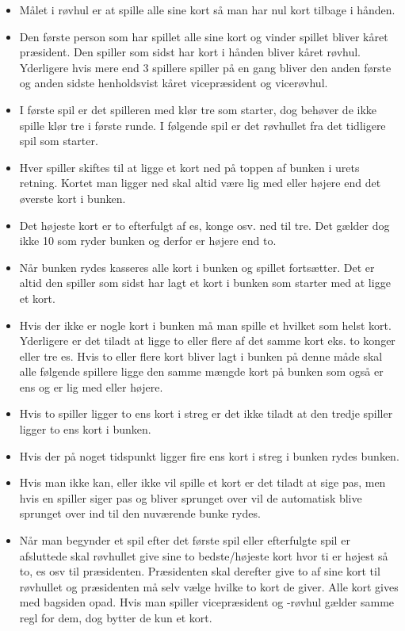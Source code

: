 \documentclass[a4paper, 12pt]{article}
\begin{document}
\begin{multicols}{2}
\begin{itemize}
	\item Målet i røvhul er at spille alle sine kort så man har nul kort tilbage i hånden.
	\item Den første person som har spillet alle sine kort og vinder spillet bliver kåret præsident. Den spiller som sidst har kort i hånden bliver kåret røvhul. Yderligere hvis mere end 3 spillere spiller på en gang bliver den anden første og anden sidste henholdsvist kåret vicepræsident og vicerøvhul.
	\item I første spil er det spilleren med klør tre som starter, dog behøver de ikke spille klør tre i første runde. I følgende spil er det røvhullet fra det tidligere spil som starter.
	\item Hver spiller skiftes til at ligge et kort ned på toppen af bunken i urets retning. Kortet man ligger ned skal altid være lig med eller højere end det øverste kort i bunken. 
	\item Det højeste kort er to efterfulgt af es, konge osv. ned til tre. Det gælder dog ikke 10 som ryder bunken og derfor er højere end to.
	\item Når bunken rydes kasseres alle kort i bunken og spillet fortsætter. Det er altid den spiller som sidst har lagt et kort i bunken som starter med at ligge et kort.
	\item Hvis der ikke er nogle kort i bunken må man spille et hvilket som helst kort. Yderligere er det tiladt at ligge to eller flere af det samme kort eks. to konger eller tre es. Hvis to eller flere kort bliver lagt i bunken på denne måde skal alle følgende spillere ligge den samme mængde kort på bunken som også er ens og er lig med eller højere.
	\item Hvis to spiller ligger to ens kort i streg er det ikke tiladt at den tredje spiller ligger to ens kort i bunken.
	\item Hvis der på noget tidspunkt ligger fire ens kort i streg i bunken rydes bunken.
	\item Hvis man ikke kan, eller ikke vil spille et kort er det tiladt at sige pas, men hvis en spiller siger pas og bliver sprunget over vil de automatisk blive sprunget over ind til den nuværende bunke rydes.
	\item Når man begynder et spil efter det første spil eller efterfulgte spil er afsluttede skal røvhullet give sine to bedste/højeste kort hvor ti er højest så to, es osv til præsidenten. Præsidenten skal derefter give to af sine kort til røvhullet og præsidenten må selv vælge hvilke to kort de giver. Alle kort gives med bagsiden opad. Hvis man spiller vicepræsident og -røvhul gælder samme regl for dem, dog bytter de kun et kort. 
\end{itemize}


\end{multicols}
\end{document}
